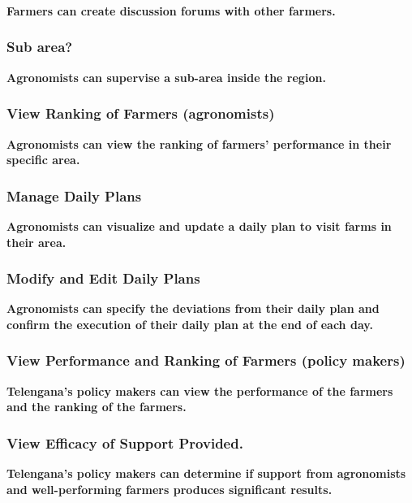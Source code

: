 \subsubsection{}
\textbf{Farmers can create discussion forums with other farmers.}
\subsubsection{Sub area?}
\textbf{Agronomists can supervise a sub-area inside the region.}
\subsubsection{View Ranking of Farmers (agronomists)}
\textbf{Agronomists can view the ranking of farmers’ performance in their specific area.}
\subsubsection{Manage Daily Plans} 
\textbf{Agronomists can visualize and update a daily plan to visit farms in their area.}
\subsubsection{Modify and Edit Daily Plans}
\textbf{Agronomists can specify the deviations from their daily plan and confirm the execution of their daily plan at the end of each day.}
\subsubsection{View Performance and Ranking of Farmers (policy makers)}
\textbf{Telengana’s policy makers can view the performance of the farmers and the ranking of the farmers.}
\subsubsection{View Efficacy of Support Provided.}
\textbf{Telengana’s policy makers can determine if support from agronomists and well-performing farmers produces significant results.}


%

